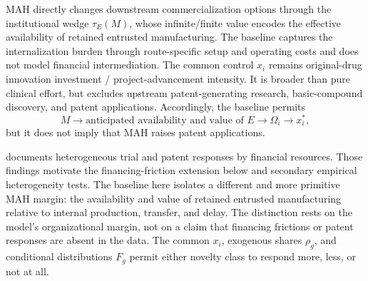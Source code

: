 \documentclass[11pt]{article}
\newcommand{\1}{\mathbf{1}}
\begin{document}
MAH directly changes downstream commercialization options through the
institutional wedge \(\tau_E(M)\), whose infinite/finite value encodes the
effective availability of retained entrusted manufacturing. The baseline
captures the internalization burden through route-specific setup and
operating costs and does not model financial intermediation. The common
control \(x_i\) remains original-drug innovation investment /
project-advancement intensity. It is broader than pure clinical effort, but
excludes upstream patent-generating research, basic-compound discovery, and
patent applications. Accordingly, the baseline
permits
\[
  M
  \longrightarrow
  \text{anticipated availability and value of }E
  \longrightarrow
  \Omega_i
  \longrightarrow
  x_i^*,
\]
but it does not imply that MAH raises patent applications.

\citet{Gu2024} documents heterogeneous trial and patent responses by financial
resources. Those findings motivate the financing-friction extension below
and secondary empirical heterogeneity tests. The baseline here isolates a
different and more primitive MAH margin: the availability and value of
retained entrusted manufacturing relative to internal production, transfer,
and delay. The distinction rests on the model's organizational margin, not on
a claim that financing frictions or patent responses are absent in the data.
The common \(x_i\), exogenous shares \(\rho_g\), and conditional distributions
\(F_g\) permit either novelty class to respond more, less, or not at all.




\clearpage


\end{document}
